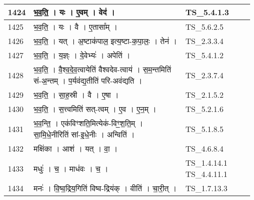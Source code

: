 \documentclass[17pt]{extarticle}
\begin{document}
\begin{longtable}{||p{0.4in}||p{4.9in}||p{0.9in}||}
    \hline
        
    1424 & भ॒व॒ति॒   ।   यः   ।   ए॒वम्   ।   वेद॑   ।    & TS\_5.4.1.3       \\
    
    \hline
        
    1425 & भ॒व॒ति॒   ।   यः   ।   वै   ।   ए॒तासा᳚म्   ।    & TS\_5.6.2.5       \\
    
    \hline
        
    1426 & भ॒व॒ति॒   ।   यत्   ।   अ॒ष्टाक॑पाल॒ इत्य॒ष्टा{-}क॒पा॒लः॒   ।   तेन॑   ।    & TS\_2.3.3.4       \\
    
    \hline
        
    1427 & भ॒व॒ति॒   ।   य॒ज्ञ्ः   ।   दे॒वेभ्यः॑   ।   अपेति॑   ।    & TS\_5.4.1.2       \\
    
    \hline
        
    1428 & भ॒व॒ति॒   ।   वै॒श्व॒दे॒व॒त्वायेति॑ वैश्वदेव{-}त्वाय॑   ।   स॒म॒न्तमिति॑ सं{-}अ॒न्तम्   ।   प॒र्यव॑द्य॒तीति॑ परि{-}अव॑द्यति   ।    & TS\_2.3.7.4       \\
    
    \hline
        
    1429 & भ॒व॒ति॒   ।   सा॒ह॒स्री   ।   वै   ।   ए॒षा   ।    & TS\_2.1.5.2       \\
    
    \hline
        
    1430 & भ॒व॒ति॒   ।   स॒त्त्वमिति॑ सत्{-}त्वम्   ।   ए॒व   ।   ए॒न॒म्   ।    & TS\_5.2.1.6       \\
    
    \hline
        
    1431 & भ॒व॒न्ति॒   ।   एक॑विꣳशति॒मित्येक॑{-}विꣳ॒॒श॒ति॒म्   ।   सा॒मि॒धे॒नीरिति॑ सां{-}इ॒धे॒नीः   ।   अन्विति॑   ।    & TS\_5.1.8.5       \\
    
    \hline
        
    1432 & मक्षि॑का   ।   आश॑   ।   यत्   ।   वा॒   ।    & TS\_4.6.8.4       \\
    
    \hline
        
    1433 & मधुः॑   ।   च॒   ।   माध॑वः   ।   च॒   ।    & TS\_1.4.14.1 TS\_4.4.11.1       \\
    
    \hline
        
    1434 & मनः॑   ।   वि॒ष्व॒द्रिय॒गिति॑ विष्व{-}द्रिय॑क्   ।   वीति॑   ।   चा॒री॒त्   ।    & TS\_1.7.13.3       \\
    

\end{longtable}
\end{document}
